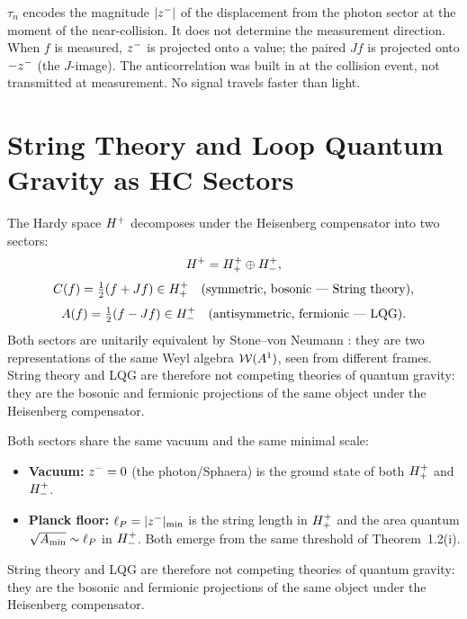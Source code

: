 \begin{remark}
$\tau_n$ encodes the magnitude $|z^-|$ of the displacement from the
photon sector at the moment of the near-collision.
It does not determine the measurement direction.
When $f$ is measured, $z^-$ is projected onto a value; the paired
$Jf$ is projected onto $-z^-$ (the $J$-image).
The anticorrelation was built in at the collision event, not transmitted
at measurement. No signal travels faster than light.
\end{remark}


\section{String Theory and Loop Quantum Gravity as HC Sectors}
\label{sec:stringlqg}

\begin{theorem}
\label{thm:string-lqg-duality}
The Hardy space $H^+$ decomposes under the Heisenberg compensator
into two sectors:
\[
  H^+ = H^+_+\oplus H^+_-,
\]
\[
  C(f) = \tfrac{1}{2}(f+Jf)\in H^+_+
  \quad\text{(symmetric, bosonic --- String theory)},
\]
\[
  A(f) = \tfrac{1}{2}(f-Jf)\in H^+_-
  \quad\text{(antisymmetric, fermionic --- LQG)}.
\]
Both sectors are unitarily equivalent by Stone--von Neumann
\cite{brendecke2026rh}: they are two representations of the same
Weyl algebra $\mathcal{W}(A^1)$, seen from different frames.
String theory and LQG are therefore not competing theories of quantum
gravity: they are the bosonic and fermionic projections of the same
object under the Heisenberg compensator.
\end{theorem}

\begin{proposition}
\label{prop:shared-vacuum-planck}
Both sectors share the same vacuum and the same minimal scale:
\begin{itemize}
  \item \textbf{Vacuum:} $z^-=0$ (the photon/Sphaera) is the ground
        state of both $H^+_+$ and $H^+_-$.
  \item \textbf{Planck floor:} $\ell_P=|z^-|_{\min}$ is the string
        length in $H^+_+$ and the area quantum
        $\sqrt{A_{\min}}\sim\ell_P$ in $H^+_-$.
        Both emerge from the same threshold of Theorem~1.2(i).
\end{itemize}
String theory and LQG are therefore not competing theories of quantum
gravity: they are the bosonic and fermionic projections of the same
object under the Heisenberg compensator.
\end{proposition}

